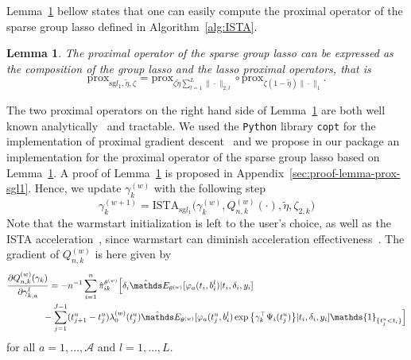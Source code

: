 \documentclass[11pt]{article}
\newtheorem{lemma}{Lemma}
\newcommand{\ind}[1]{\mathds{1}_{#1}}
\newcommand{\norm}[1]{\|#1\|}
\newcommand{\E}{\mathds E}
\begin{document}
\vspace{.5cm}
Lemma~\ref{lemma:prox-sgl1} bellow states that one can easily compute the proximal operator of the sparse group lasso defined in Algorithm~\ref{alg:ISTA}.
\begin{lemma}
\label{lemma:prox-sgl1}
The proximal operator of the sparse group lasso can be expressed as the composition of the group lasso and the lasso proximal operators, that is
\normalfont
\begin{equation*}
  \text{prox}_{\text{sg} l_1,\tilde \eta, \zeta} = \text{prox}_{\zeta \tilde \eta \sum_{l=1}^L \norm{\cdot}_{2,l}} \circ \text{prox}_{\zeta (1 - \tilde \eta) \norm{\cdot}_1}.
\end{equation*}
\end{lemma}
The two proximal operators on the right hand side of Lemma~\ref{lemma:prox-sgl1} are both well known analytically~\citep{bach2011optimization} and tractable. We used the \texttt{Python} library \texttt{copt} for the implementation of proximal gradient descent~\citep{copt} and we propose in our package an implementation for the proximal operator of the sparse group lasso based on Lemma~\ref{lemma:prox-sgl1}.
A proof of Lemma~\ref{lemma:prox-sgl1} is proposed in Appendix~\ref{sec:proof-lemma-prox-sgl1}.
Hence, we update $\gamma_k^{(w)}$ with the following step
\begin{equation}
  \label{eq:gamma-update}
  \gamma_k^{(w+1)} = \text{ISTA}_{\text{sg} l_1}\big(\gamma_k^{(w)}, Q^{(w)}_{n,k}(\cdot), \tilde \eta, \zeta_{2,k}\big)
\end{equation}
Note that the warmstart initialization is left to the user's choice, as well as the ISTA acceleration~\citep{beck2009fast}, since warmstart can diminish acceleration effectiveness~\citep{tibshirani2010proximal}. The gradient of $Q_{n,k}^{(w)}$ is here given by
\begin{align}
  \label{eq:grad-Q}
  &\frac{\partial Q_{n,k}^{(w)}(\gamma_k)}{\partial \gamma_{k,a}^l} = -n^{-1} \sum_{i=1}^n \hat \pi_{ik}^{\theta^{(w)}} \Big[ \delta_i  \hat \E_{\theta^{(w)}}[ \varphi_a(t_i, b_i^l) | t_i, \delta_i, y_i] \\ \nonumber
   &\qquad\qquad - \sum_{j=1}^{J-1} (t_{j+1}^u-t_j^u) \lambda_0^{(w)}(t_j^u) \hat \E_{\theta^{(w)}}[ \varphi_a(t_j^u, b_i^l) \exp \big\{\gamma_k^\top \Psi_i(t_j^u)\big\} | t_i, \delta_i, y_i] \ind{\{t_j^u < t_i\}} \Big]
\end{align}
for all $a = 1, \ldots, \mathcal{A}$ and $l = 1, \ldots, L$.
\end{document}
